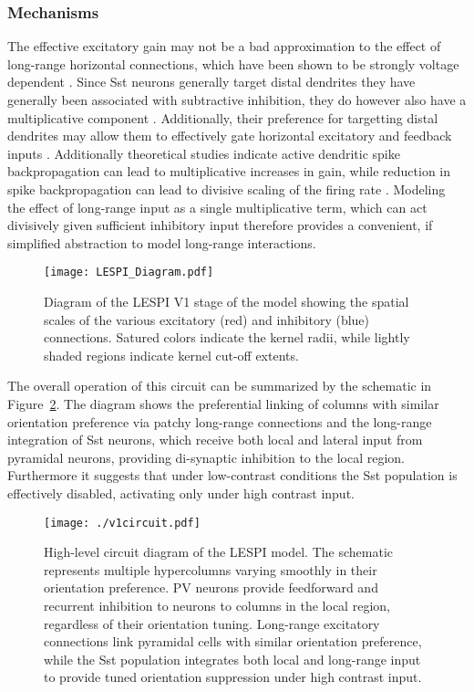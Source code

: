 \subsubsection{Mechanisms}

The effective excitatory gain may not be a bad approximation to the
effect of long-range horizontal connections, which have been shown to
be strongly voltage dependent \citep{Hirsch1991}. Since Sst neurons
generally target distal dendrites they have generally been associated
with subtractive inhibition, they do however also have a
multiplicative component \citep{Wilson2012}. Additionally, their
preference for targetting distal dendrites may allow them to
effectively gate horizontal excitatory and feedback inputs
\citep{Ma2011, Gentet2012}. Additionally theoretical studies indicate
active dendritic spike backpropagation can lead to multiplicative
increases in gain, while reduction in spike backpropagation can lead
to divisive scaling of the firing rate \citep{Mehaffey2005}. Modeling
the effect of long-range input as a single multiplicative term, which
can act divisively given sufficient inhibitory input therefore
provides a convenient, if simplified abstraction to model long-range
interactions.

\begin{figure}
	\centering
        \texttt{[image: LESPI\_Diagram.pdf]}
	\caption{Diagram of the LESPI V1 stage of the model showing the
          spatial scales of the various excitatory (red) and
          inhibitory (blue) connections. Satured colors indicate the
          kernel radii, while lightly shaded regions indicate kernel
          cut-off extents.}
	\label{LESPIDiagram}
\end{figure}

The overall operation of this circuit can be summarized by the
schematic in Figure~\ref{circuit_diagram}. The diagram shows the
preferential linking of columns with similar orientation preference
via patchy long-range connections and the long-range integration of
Sst neurons, which receive both local and lateral input from pyramidal
neurons, providing di-synaptic inhibition to the local
region. Furthermore it suggests that under low-contrast conditions the
Sst population is effectively disabled, activating only under high
contrast input.

\begin{figure}
	\centering
	\texttt{[image: ./v1circuit.pdf]}
	\caption[High-level circuit diagram of the LESPI
      model.]{High-level circuit diagram of the LESPI model. The
      schematic represents multiple hypercolumns varying smoothly in
      their orientation preference. PV neurons provide feedforward and
      recurrent inhibition to neurons to columns in the local region,
      regardless of their orientation tuning. Long-range excitatory
      connections link pyramidal cells with similar orientation
      preference, while the Sst population integrates both local and
      long-range input to provide tuned orientation suppression under
      high contrast input.}
    \label{circuit_diagram}
\end{figure}


